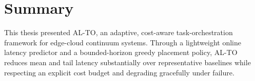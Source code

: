 \section{Summary}
This thesis presented AL-TO, an adaptive, cost-aware task-orchestration framework for edge-cloud continuum systems. Through a lightweight online latency predictor and a bounded-horizon greedy placement policy, AL-TO reduces mean and tail latency substantially over representative baselines while respecting an explicit cost budget and degrading gracefully under failure.
